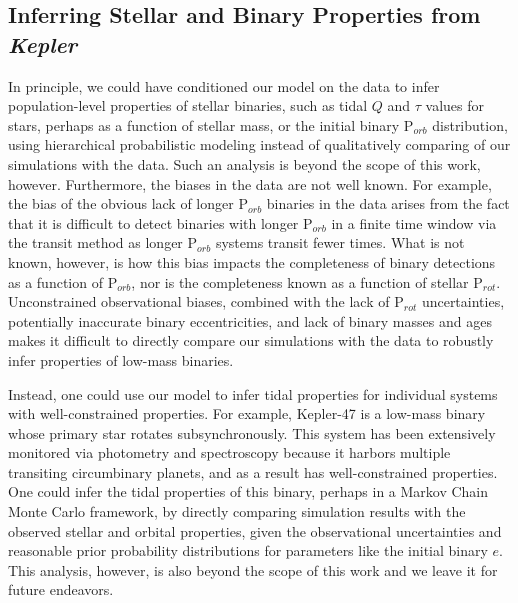\documentclass[twocolumn]{aastex61}
\newcommand{\kepler}[0]{\textit{Kepler}\xspace}
\begin{document}

\subsection{Inferring Stellar and Binary Properties from \kepler} \label{sec:inference}

In principle, we could have conditioned our model on the \citet{Lurie2017} data to infer population-level properties of stellar binaries, such as tidal $Q$ and $\tau$ values for stars, perhaps as a function of stellar mass, or the initial binary P$_{orb}$ distribution, using hierarchical probabilistic modeling instead of qualitatively comparing of our simulations with the data. Such an analysis is beyond the scope of this work, however.  Furthermore, the biases in the \citet{Lurie2017} data are not well known.  For example, the bias of the obvious lack of longer P$_{orb}$ binaries in the \citet{Lurie2017} data arises from the fact that it is difficult to detect binaries with longer P$_{orb}$ in a finite time window via the transit method as longer P$_{orb}$ systems transit fewer times.  What is not known, however, is how this bias impacts the completeness of binary detections as a function of P$_{orb}$, nor is the completeness known as a function of stellar P$_{rot}$. Unconstrained observational biases, combined with the lack of P$_{rot}$ uncertainties, potentially inaccurate binary eccentricities, and lack of binary masses and ages makes it difficult to directly compare our simulations with the data to robustly infer properties of low-mass binaries.

Instead, one could use our model to infer tidal properties for individual systems with well-constrained properties.  For example, Kepler-47 \citep{Orosz2012} is a low-mass binary whose primary star rotates subsynchronously.  This system has been extensively monitored via photometry and spectroscopy because it harbors multiple transiting circumbinary planets, and as a result has well-constrained properties. One could infer the tidal properties of this binary, perhaps in a Markov Chain Monte Carlo framework, by directly comparing simulation results with the observed stellar and orbital properties, given the observational uncertainties and reasonable prior probability distributions for parameters like the initial binary $e$. This analysis, however, is also beyond the scope of this work and we leave it for future endeavors.
\end{document}
